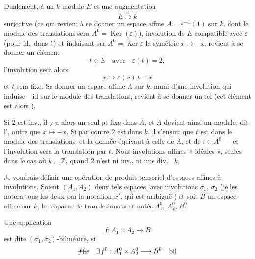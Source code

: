 \documentclass[11pt,a4paper]{article}
\begin{document}
Dualement,   à un $k$-module $E$ et une augmentation
\[
  E \xrightarrow{\ \varepsilon\ } k
\]
surjective (ce qui revient à se donner un espace affine $A = \varepsilon^{-1}(1)$ sur $k$, dont le module des translations sera $A^0 = \operatorname{Ker}(\varepsilon)$),   involution de $E$ compatible avec $\varepsilon$ (pour id.\ dans $k$) et induisant sur $A^0 = \operatorname{Ker}\varepsilon$ la symétrie $x \mapsto -x$, revient à se donner un élément
\[
  t \in E \quad \text{avec} \quad \varepsilon(t) = 2 ,
\]
l'involution sera alors
\[
  x \longmapsto \varepsilon(x)\,t - x
\]
et $t$ sera fixe. Se donner un espace affine $A$ sur $k$, muni d'une involution qui induise $-\mathrm{id}$ sur le module des translations, revient à se donner un tel  (cet élément est alors  \ill{}).

Si $2$ est inv., il y a alors un seul pt fixe dans $A$, et $A$ devient ainsi un module, dit l', \ill{} autre que $x \mapsto -x$. Si par contre $2$ est   dans $k$, \struck{\ill{}} il s'ensuit que $t$ est dans le module des translations, et la donnée équivaut à celle de $A$, et de $t \in A^0$ --- et l'involution sera la translation par $t$. Nous \ill{} involutions affines « idéales »,  seules  dans le cas où $k = \mathbb{Z}$, quand $2$ n'est ni inv., ni une div.\ \ill{} $k$. 

Je voudrais définir une opération de produit tensoriel d'espaces affines à involutions. Soient $(A_1, A_2)$ deux tels espaces, avec involutions $\sigma_1$, $\sigma_2$ (je les notera tous les deux par la notation $x'$, qui est ambiguë \struck{\ill{}}) et soit $B$ un espace affine sur $k$, les espaces de translations sont notés $A_1^0$, $A_2^0$, $B^0$.


Une application
\[
  f : A_1 \times A_2 \longrightarrow B
\]
est dite $(\sigma_1, \sigma_2)$-bilinéaire, si \struck{$\exists$}
\[
  \text{\struck{$f(x$}} \quad \exists\, f^0 : A_1^0 \times A_2^0 \longrightarrow B^0 \quad \text{bil}
\]
\end{document}
